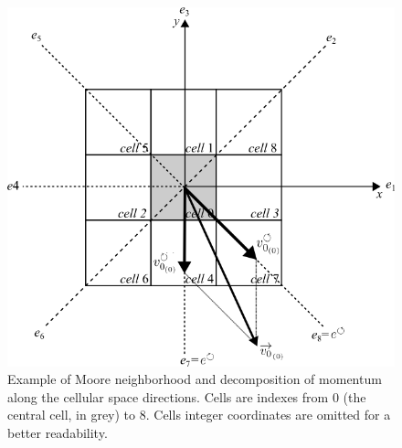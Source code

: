 \begin{figure}
\begin{center}
  \includegraphics[scale=0.65]{./images/mooreNeighSciaraModel}
  \caption{Example of Moore neighborhood and decomposition of momentum
along the cellular space directions. Cells are indexes from 0 (the central cell,
in grey) to 8. Cells integer coordinates are omitted for a better readability.}
  \label{fig:mooreNeighModel}
\end{center}
\end{figure}


